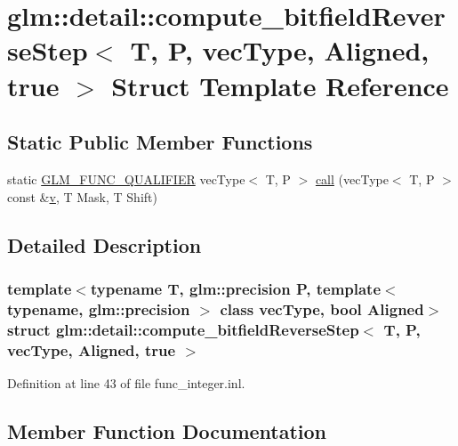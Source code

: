 \hypertarget{structglm_1_1detail_1_1compute__bitfield_reverse_step_3_01_t_00_01_p_00_01vec_type_00_01_aligned_00_01true_01_4}{}\section{glm\+::detail\+::compute\+\_\+bitfield\+Reverse\+Step$<$ T, P, vec\+Type, Aligned, true $>$ Struct Template Reference}
\label{structglm_1_1detail_1_1compute__bitfield_reverse_step_3_01_t_00_01_p_00_01vec_type_00_01_aligned_00_01true_01_4}
\subsection*{Static Public Member Functions}
\begin{DoxyCompactItemize}
\item 
static \mbox{\hyperlink{setup_8hpp_a33fdea6f91c5f834105f7415e2a64407}{G\+L\+M\+\_\+\+F\+U\+N\+C\+\_\+\+Q\+U\+A\+L\+I\+F\+I\+ER}} vec\+Type$<$ T, P $>$ \mbox{\hyperlink{structglm_1_1detail_1_1compute__bitfield_reverse_step_3_01_t_00_01_p_00_01vec_type_00_01_aligned_00_01true_01_4_a823f1a6a1f91ef154a334afb668f54e6}{call}} (vec\+Type$<$ T, P $>$ const \&\mbox{\hyperlink{glad_8h_a14cfbe2fc2234f5504618905b69d1e06}{v}}, T Mask, T Shift)
\end{DoxyCompactItemize}


\subsection{Detailed Description}
\subsubsection*{template$<$typename T, glm\+::precision P, template$<$ typename, glm\+::precision $>$ class vec\+Type, bool Aligned$>$\newline
struct glm\+::detail\+::compute\+\_\+bitfield\+Reverse\+Step$<$ T, P, vec\+Type, Aligned, true $>$}



Definition at line 43 of file func\+\_\+integer.\+inl.



\subsection{Member Function Documentation}
\mbox{\label{structglm_1_1detail_1_1compute__bitfield_reverse_step_3_01_t_00_01_p_00_01vec_type_00_01_aligned_00_01true_01_4_a823f1a6a1f91ef154a334afb668f54e6}} 
